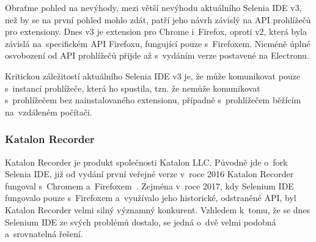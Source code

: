 \documentclass[12pt, a4paper, twoside]{article}
\begin{document}
	\noindent Obraťme pohled na nevýhody, mezi větší nevýhodu aktuálního Selenia IDE v3, než by se na první pohled mohlo zdát, patří jeho návrh závislý na API prohlížečů pro extensiony. Dnes v3 je extension pro Chrome i~Firefox, oproti v2, která byla závislá na~specifickém API Firefoxu, fungující pouze s~Firefoxem. Nicméně úplné osvobození od API prohlížečů přijde až s~vydáním verze postavené na Electronu.
	
	Kritickou záležitostí aktuálního Selenia IDE v3 je, že může komunikovat pouze s~instancí prohlížeče, která ho spustila, tzn. že nemůže komunikovat s~prohlížečem bez nainstalovaného extensionu, případně s~prohlížečem běžícím na~vzdáleném počítači.
	\subsubsection{Katalon Recorder}
	Katalon Recorder je produkt společnosti Katalon LLC. Původně jde o~fork Selenia IDE, již od vydání první veřejné verze v~roce 2016 Katalon Recorder fungoval s~Chromem a~Firefoxem~\cite{katalonRecorderMainPage, katalonRecorderWikipedia}. Zejména v~roce 2017, kdy Selenium IDE fungovalo pouze s~Firefoxem a~využívalo jeho historické, odstraněné API, byl Katalon Recorder velmi silný významný konkurent. Vzhledem k~tomu, že se dnes Selenium IDE ze svých problémů dostalo, se jedná o~dvě velmi podobná a~srovnatelná řešení.
\end{document}
